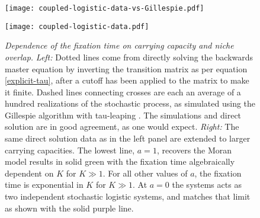 \iffalse
\begin{figure}[ht]
	\centering
	\texttt{[image: coupled-logistic-data-vs-Gillespie.pdf]}
	\caption{\emph{Directly solving the (truncated) master equation agrees with Gillespie simulations.} Solid lines come from directly solving the backwards master equation by inverting the transition matrix, after a cutoff has been applied to the matrix to make it finite. Dashed lines are each an average of a hundred realizations of the stochastic process, as simulated using the Gillespie algorithm. }
	\label{Gillespie}
\end{figure}
\begin{figure}[ht]
	\centering
	\texttt{[image: \{coupled-logistic-data]}}
	\caption{\emph{Dependence of the fixation time on carrying capacity and niche overlap.}
		The lowest line, $a=1$, recovers the Moran model results with the fixation time algebraically dependent on $K$ for $K\gg 1$. For all other values of $a$, the fixation time is exponential in $K$ for $K\gg 1$.
	} \label{lntauvK}
\end{figure}
\fi
\begin{figure}[h]
	\centering
	\begin{minipage}{0.49\linewidth}
		\centering
		\texttt{[image: coupled-logistic-data-vs-Gillespie.pdf]}
	\end{minipage}
	\begin{minipage}{0.49\linewidth}
		\centering
		\texttt{[image: coupled-logistic-data.pdf]}
	\end{minipage}
	\caption{\emph{Dependence of the fixation time on carrying capacity and niche overlap.}
		\emph{Left:} Dotted lines come from directly solving the backwards master equation by inverting the transition matrix as per equation \ref{explicit-tau}, after a cutoff has been applied to the matrix to make it finite. Dashed lines connecting crosses are each an average of a hundred realizations of the stochastic process, as simulated using the Gillespie algorithm with tau-leaping \cite{Gillespie1977,Cao2006}. The simulations and direct solution are in good agreement, as one would expect. 
		\emph{Right:} The same direct solution data as in the left panel are extended to larger carrying capacities. The lowest line, $a=1$, recovers the Moran model results in solid green with the fixation time algebraically dependent on $K$ for $K\gg 1$. For all other values of $a$, the fixation time is exponential in $K$ for $K\gg 1$. At $a=0$ the systems acts as two independent stochastic logistic systems, and matches that limit as shown with the solid purple line. 
	} \label{lntauvK}
\end{figure}


